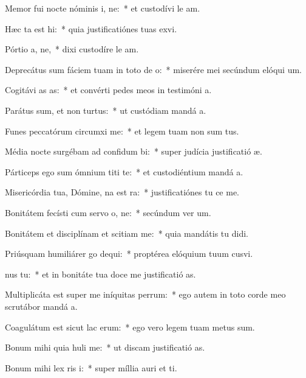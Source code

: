 \item Memor fui nocte nóminis i, ne:~* et custodívi le am.
\item Hæc ta est hi:~* quia justificatiónes tuas exvi.
\item Pórtio a, ne,~* dixi custodíre le am.
\item Deprecátus sum fáciem tuam in toto de o:~* miserére mei secúndum elóqui um.
\item Cogitávi as as:~* et convérti pedes meos in testimóni a.
\item Parátus sum, et non  turtus:~* ut custódiam mandá a.
\item Funes peccatórum circumxi  me:~* et legem tuam non sum tus.
\item Média nocte surgébam ad confidum bi:~* super judícia justificatió æ.
\item Párticeps ego sum ómnium titi te:~* et custodiéntium mandá a.
\item Misericórdia tua, Dómine, na est ra:~* justificatiónes tu ce me.
\item Bonitátem fecísti cum servo o, ne:~* secúndum ver um.
\item Bonitátem et disciplínam et scitiam  me:~* quia mandátis tu didi.
\item Priúsquam humiliárer go dequi:~* proptérea elóquium tuum cusvi.
\item {}nus  tu:~* et in bonitáte tua doce me justificatió as.
\item Multiplicáta est super me iníquitas perrum:~* ego autem in toto corde meo scrutábor mandá a.
\item Coagulátum est sicut lac  erum:~* ego vero legem tuam metus sum.
\item Bonum mihi quia huli me:~* ut discam justificatió as.
\item Bonum mihi lex ris i:~* super míllia auri et ti.
